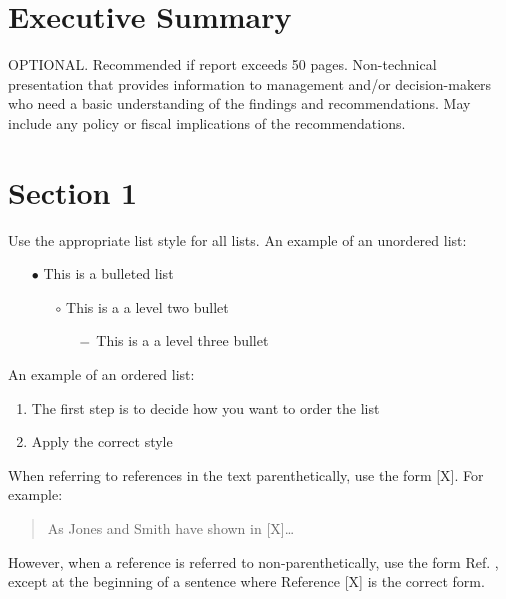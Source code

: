  \tagpdfparaOff {}
\section*{Executive Summary}
\tagmcend
 \tagstructend
\label{sec:es}
\tagpdfparaOn
\normalsize OPTIONAL. Recommended if report exceeds 50 pages. Non-technical presentation that provides information to management and/or decision-makers who need a basic understanding of the findings and recommendations. May include any policy or fiscal implications of the recommendations.
\newpage
 \tagpdfparaOff {}
\section{Section 1}
\tagmcend
 \tagstructend
 
\label{sec:intro}
\tagpdfparaOn
\normalsize 
Use the appropriate list style for all lists. An example of an unordered list:
\begin{itemize}
    \item[$\bullet$]  This is a bulleted list
    \begin{itemize}
        \item[$\circ$] This is a a level two bullet
        \begin{itemize}
        \item[$\--$]  This is a a level three bullet
    \end{itemize}
    \end{itemize}
\end{itemize}

An example of an ordered list:
\begin{enumerate}
    \item The first step is to decide how you want to order the list
    \item Apply the correct style
\end{enumerate}

When referring to references in the text parenthetically, use the form [X]. For example: 
\begin{quote}
As Jones and Smith have shown in [X]… 
\end{quote}
However, when a reference is referred to non-parenthetically, use the form Ref. \cite{Caxton,Eston1993,Farindon,FIPS1402,giancoli2008physics,Isley,Joslin,Maloney2016,MSU-CSE-06-2,Prives2016,Roberts1982,SP80053r4,Xiong2015}, except at the beginning of a sentence where Reference [X] is the correct form.

